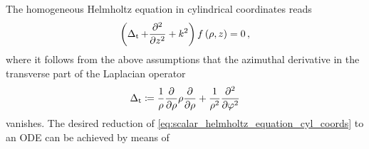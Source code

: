 The homogeneous Helmholtz equation in cylindrical coordinates reads
\begin{equation}\label{eq:scalar_helmholtz_equation_cyl_coords}
	\left( \operatorname{\operatorname{\Delta}_\mathrm{t}} + \frac{\partial^2}{\partial z^2} + k^2 \right)
	f \left(\rho, z\right) = 0
	\, ,
\end{equation}
where it follows from the above assumptions that the azimuthal derivative in
the transverse part of the Laplacian operator
\begin{equation}\label{eq:def_laplace_trans}
	\operatorname{\operatorname{\Delta}_\mathrm{t}} \coloneqq
	\frac{1}{\rho}
	\frac{\partial}{\partial \rho}
	\rho
	\frac{\partial}{\partial \rho}
	+
	\frac{1}{\rho^2}
	\frac{\partial^2}{\partial \varphi^2}
\end{equation}
vanishes. 
The desired reduction of \eqref{eq:scalar_helmholtz_equation_cyl_coords} to
an \ac{ODE} can be achieved by means of

